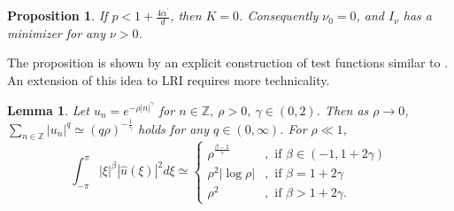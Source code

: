 \documentclass{article}
\numberwithin{equation}{section}
\newtheorem{lemma}{Lemma}[section]
\newtheorem{proposition}{Proposition}[section]
\begin{document}
\begin{proposition}\label{p2}
If $p < 1 + \frac{4\alpha^\prime}{d}$, then $K = 0$. Consequently $\nu_0 = 0$, and $I_\nu$ has a minimizer for any $\nu > 0$.
\end{proposition}
The proposition is shown by an explicit construction of test functions similar to \cite[Proposition 4.1]{weinstein1999excitation}. An extension of this idea to LRI requires more technicality.
\begin{lemma}\label{quadratic_form}
Let $u_n = e^{-\rho |n|^{\gamma}}$ for $n \in \mathbb{Z},\ \rho>0,\ \gamma \in (0,2)$. Then as $\rho \rightarrow 0$, $\sum\limits_{n \in \mathbb{Z}} |u_n|^q \simeq (q \rho)^{-\frac{1}{\gamma}}$ holds for any $q \in (0,\infty)$. For $\rho \ll 1$,
\begin{equation}\label{quadratic_form2}
    \int_{-\pi}^{\pi} |\xi|^\beta |\widehat{u}(\xi)|^2 d\xi \simeq
    \begin{cases}
            \rho^{\frac{\beta-1}{\gamma}}
            & ,\text{ if } \beta \in (-1,1+2\gamma)\\
            \rho^2 |\log \rho| & ,\text{ if } \beta = 1+2\gamma\\
            \rho^2 & ,\text{ if } \beta > 1+2\gamma.
    \end{cases}
\end{equation}
\end{lemma}
\end{document}

